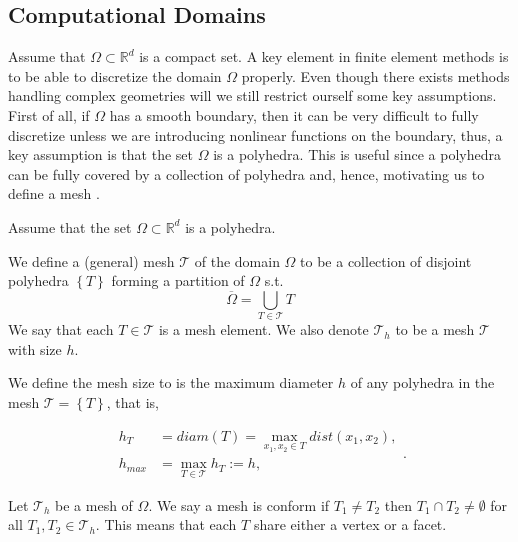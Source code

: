 \subsection{Computational Domains}%
\label{sub:computational_domain}
Assume that $\Omega \subset \mathbb{R} ^{d} $ is a compact set.
A key element in finite element methods is to be able to discretize the domain $\Omega $ properly. Even though there exists methods handling complex geometries will we still restrict ourself some key assumptions. First of all,
if $\Omega $ has a smooth boundary, then it can be very difficult to fully discretize unless we are introducing nonlinear functions on the boundary, thus, a key assumption is that the set $\Omega $ is a polyhedra. This is useful since a polyhedra can
be fully covered by a collection of polyhedra and, hence, motivating us to define a mesh \cite[Assumption 1.7]{pietro2012}.

\begin{assumption}
   Assume that the set $\Omega \subset \mathbb{R} ^{d} $ is a polyhedra.
\end{assumption}

\begin{definition}[Mesh]
    We define a (general) mesh $\mathcal{T} $ of the domain $\Omega $ to be a collection of disjoint polyhedra $\left\{ T \right\}  $ forming a partition of $\Omega $ s.t.\[
    \overline{\Omega } = \bigcup _{T \in \mathcal{T} } T
    \]
    We say that each $T \in  \mathcal{T} $ is a mesh element. We also denote $\mathcal{T} _{h}$ to be a mesh $\mathcal{T} $ with size $h$.
\end{definition}

\begin{definition}
We define the mesh size to is the maximum diameter $h $ of any polyhedra in the mesh $\mathcal{T} = \left\{ T \right\}  $, that is,

\begin{equation}
\begin{split}
    h _{T} & = diam\left( T \right)   = \max_{x_1, x_{2} \in T} dist(x_{1}, x_{2}),  \\
    h_{max} &= \max_{T \in \mathcal{T} }  h_{T} := h,
\end{split}
.\end{equation}
\end{definition}

\begin{definition}
Let $\mathcal{T}_{h} $ be a mesh of $\Omega $. We say a mesh is conform if $T_{1} \neq T_{2 }$  then $T_{1} \cap T_{2} \neq \emptyset  $ for all $T_{1}, T_{2} \in \mathcal{T}_{h}$. This means that each $T$ share either a vertex or a facet.
\end{definition}

